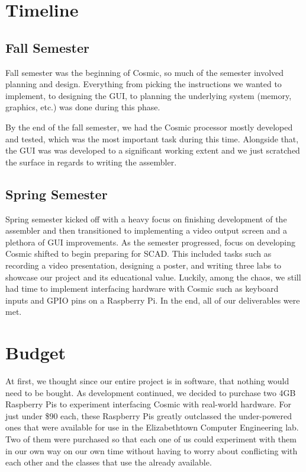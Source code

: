 \documentclass[conference]{IEEEtran}
\begin{document}
\section{Timeline}

\subsection{Fall Semester}
Fall semester was the beginning of Cosmic, so much of the semester involved planning and design. Everything from picking the instructions we wanted to implement, to designing the GUI, to planning the underlying system (memory, graphics, etc.) was done during this phase.

By the end of the fall semester, we had the Cosmic processor mostly developed and tested, which was the most important task during this time. Alongside that, the GUI was was developed to a significant working extent and we just scratched the surface in regards to writing the assembler.


\subsection{Spring Semester}
Spring semester kicked off with a heavy focus on finishing development of the assembler and then transitioned to implementing a video output screen and a plethora of GUI improvements. As the semester progressed, focus on developing Cosmic shifted to begin preparing for SCAD. This included tasks such as recording a video presentation, designing a poster, and writing three labs to showcase our project and its educational value. Luckily, among the chaos, we still had time to implement interfacing hardware with Cosmic such as keyboard inputs and GPIO pins on a Raspberry Pi. In the end, all of our deliverables were met.


\section{Budget}
At first, we thought since our entire project is in software, that nothing would need to be bought. As development continued, we decided to purchase two 4GB Raspberry Pis to experiment interfacing Cosmic with real-world hardware. For just under \$90 each, these Raspberry Pis greatly outclassed the under-powered ones that were available for use in the Elizabethtown Computer Engineering lab. Two of them were purchased so that each one of us could experiment with them in our own way on our own time without having to worry about conflicting with each other and the classes that use the already available.
\end{document}
